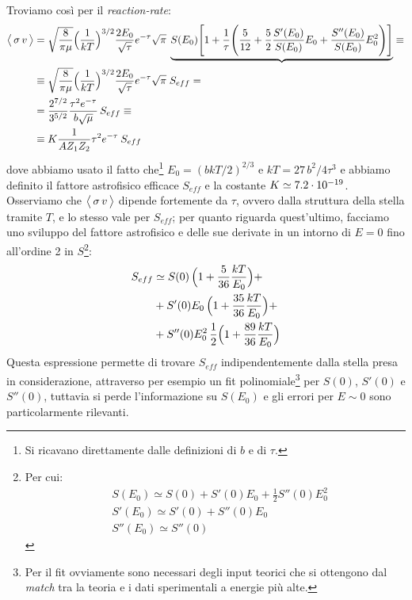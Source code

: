Troviamo così per il \textit{reaction-rate}:
\begin{displaymath}
\begin{aligned}
\bigl\langle\, \sigma\,v \, \bigr\rangle &=  \sqrt{\frac{8}{\pi\mu}} \Bigl ( \frac{1}{kT} \Bigr )^{3/2} \frac{2E_0}{\sqrt{\tau}}e^{-\tau}\sqrt{\pi}\: \underbrace{ S(E_0) \Biggl [ 1+\frac{1}{\tau} \Biggl ( \frac{5}{12} +\frac{5}{2} \frac{S'(E_0)}{S(E_0)}E_0 + \frac{S''(E_0)}{S(E_0)}E_0^2 \Biggr ) \Biggr ] } \equiv\\
&\equiv \sqrt{\frac{8}{\pi\mu}} \Bigl ( \frac{1}{kT} \Bigr )^{3/2} \frac{2E_0}{\sqrt{\tau}}e^{-\tau}\sqrt{\pi}\; S_{eff} =\\
&= \frac{2^{7/2}}{3^{5/2}} \frac{\tau^2 e^{-\tau}}{b\sqrt{\mu}}\, S_{eff} \equiv\\
&\equiv K \frac{1}{AZ_1Z_2} \tau^2 e^{-\tau} \: S_{eff}
\end{aligned}
\end{displaymath}
dove abbiamo usato il fatto che\footnote{Si ricavano direttamente dalle definizioni di $b$ e di $\tau$.} $E_0 = (bkT/2)^{2/3}$ e $kT = 27\,b^2/4\tau^3$ e abbiamo definito il fattore astrofisico efficace $S_{eff}$ e la costante $K\simeq 7.2\cdot10^{-19}$. Osserviamo che $\bigl\langle\, \sigma\,v\, \bigr\rangle$ dipende fortemente da $\tau$, ovvero dalla struttura della stella tramite $T$, e lo stesso vale per $S_{eff}$; per quanto riguarda quest'ultimo, facciamo uno sviluppo del fattore astrofisico e delle sue derivate in un intorno di $E=0$ fino all'ordine 2 in $S$\footnote{Per cui:%
\begin{displaymath}%
\begin{aligned}%
&S(E_0)   \simeq S(0) + S'(0) E_0 + \frac{1}{2} S''(0) E_0^2 \\ 
&S'(E_0)  \simeq  S'(0)  + S''(0) E_0 \\ 
&S''(E_0) \simeq  S''(0)
\end{aligned}%
\end{displaymath}%
}:
\begin{displaymath}
\begin{aligned}
S_{eff} &\simeq S(0)\, \Bigl ( 1+\frac{5}{36}\frac{kT}{E_0} \Bigr ) +\\
&+ S'(0) E_0\, \Bigl ( 1+\frac{35}{36}\frac{kT}{E_0} \Bigr ) +\\
&+ S''(0) E_0^2\, \frac{1}{2} \Bigl ( 1+\frac{89}{36}\frac{kT}{E_0} \Bigr )
\end{aligned}
\end{displaymath}
Questa espressione permette di trovare $S_{eff}$ indipendentemente dalla stella presa in considerazione, attraverso per esempio un fit polinomiale\footnote{Per  il fit ovviamente sono necessari degli input teorici che si ottengono dal \textit{match} tra la teoria e i dati sperimentali a energie più alte.} per $S(0)$, $S'(0)$ e $S''(0)$, tuttavia si perde l'informazione su $S(E_0)$ e gli errori per $E\sim0$ sono particolarmente rilevanti. 
